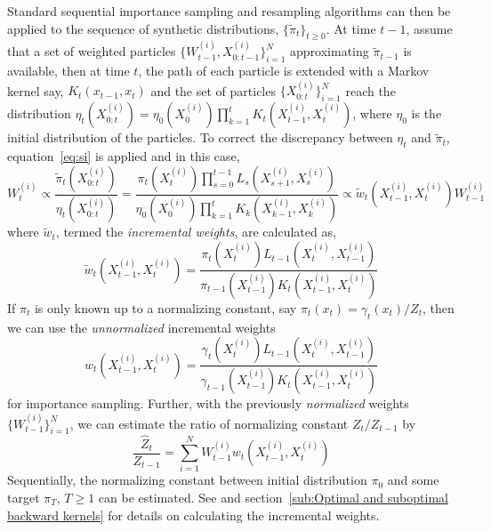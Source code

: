 Standard sequential importance sampling and resampling algorithms can then be
applied to the sequence of synthetic distributions, $\{\tilde\pi_t\}_{t\ge0}$.
At time $t - 1$, assume that a set of weighted particles
$\{W_{t-1}^{(i)},X_{0:t-1}^{(i)}\}_{i=1}^N$ approximating $\tilde\pi_{t-1}$ is
available, then at time $t$, the path of each particle is extended with a
Markov kernel say, $K_t(x_{t-1}, x_t)$ and the set of particles
$\{X_{0:t}^{(i)}\}_{i=1}^N$ reach the distribution $\eta_t(X_{0:t}^{(i)}) =
\eta_0(X_0^{(i)})\prod_{k=1}^tK_t(X_{t-1}^{(i)}, X_t^{(i)})$, where $\eta_0$
is the initial distribution of the particles. To correct the discrepancy
between $\eta_t$ and $\tilde\pi_t$, equation~\ref{eq:si} is applied and in
this case,
\begin{equation}
  W_t^{(i)} \propto \frac{\tilde\pi_t(X_{0:t}^{(i)})}{\eta_t(X_{0:t}^{(i)})}
  = \frac{\pi_t(X_t^{(i)})\prod_{s=0}^{t-1}L_s(X_{s+1}^{(i)}, X_s^{(i)})}
  {\eta_0(X_0^{(i)})\prod_{k=1}^tK_k(X_{k-1}^{(i)},X_k^{(i)})}
  \propto \tilde{w}_t(X_{t-1}^{(i)}, X_t^{(i)})W_{t-1}^{(i)}
\end{equation}
where $\tilde{w}_t$, termed the \emph{incremental weights}, are calculated as,
\begin{equation}
  \tilde{w}_t(X_{t-1}^{(i)},X_t^{(i)}) =
  \frac{\pi_t(X_t^{(i)})L_{t-1}(X_t^{(i)}, X_{t-1}^{(i)})}
  {\pi_{t-1}(X_{t-1}^{(i)})K_t(X_{t-1}^{(i)}, X_t^{(i)})}
\end{equation}
If $\pi_t$ is only known up to a normalizing constant, say $\pi_t(x_t) =
\gamma_t(x_t)/Z_t$, then we can use the \emph{unnormalized} incremental
weights
\begin{equation}
  w_t(X_{t-1}^{(i)},X_t^{(i)}) =
  \frac{\gamma_t(X_t^{(i)})L_{t-1}(X_t^{(i)}, X_{t-1}^{(i)})}
  {\gamma_{t-1}(X_{t-1}^{(i)})K_t(X_{t-1}^{(i)}, X_t^{(i)})}
\end{equation}
for importance sampling. Further, with the previously \emph{normalized}
weights $\{W_{t-1}^{(i)}\}_{i=1}^N$, we can estimate the ratio of normalizing
constant $Z_t/Z_{t-1}$ by
\begin{equation}
  \frac{\hat{Z}_t}{Z_{t-1}} =
  \sum_{i=1}^N W_{t-1}^{(i)}w_t(X_{t-1}^{(i)},X_t^{(i)})
  \label{eq:ratio normalized}
\end{equation}
Sequentially, the normalizing constant between initial distribution $\pi_0$
and some target $\pi_T$, $T\ge1$ can be estimated. See \cite{DelMoral:2006hc}
and section~\ref{sub:Optimal and suboptimal backward kernels} for details on
calculating the incremental weights.

